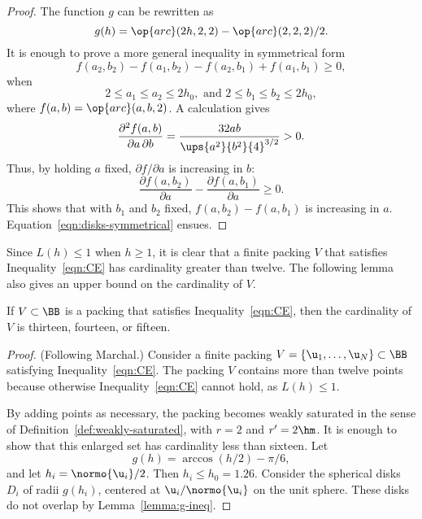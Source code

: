 \begin{cnl}
\begin{proof}
The function $g$ can be rewritten as
\[
g(h) = \op{arc}(2h,2,2) - \op{arc}(2,2,2)/2.
\]
It is enough to prove a  more general inequality in
  symmetrical form
\begin{equation}\label{eqn:disks-symmetrical}
f(a_2,b_2) - f(a_1,b_2) - f(a_2,b_1) + f(a_1,b_1)\ge0, 
\end{equation}
when
\[
2\le a_1 \le a_2 \le 2h_0,\text{ and } 2\le b_1\le b_2 \le 2h_0,
\]
where $f(a,b) = \op{arc}(a,b,2)$.  
A calculation gives
\[
 \frac {\partial^2 f(a,b)}{\partial a\,\partial b} = \frac{32 a b}{\ups{a^2}{b^2}{4}^{3/2}} > 0.
\]
Thus, by holding $a$ fixed, $\partial f/\partial a$ is increasing in $b$:
\[
 \frac {\partial f(a,b_2) } {\partial a} -\frac{\partial f(a,b_1)}{\partial a} \ge 0.
\]
This shows that with $b_1$ and $b_2$ fixed, 
$f(a,b_2)-f(a,b_1)$ is increasing in $a$.
Equation~\ref{eqn:disks-symmetrical} ensues.
\end{proof}

Since $L(h)\le 1$ when $h\ge1$, it is clear that a finite packing $V$
that satisfies Inequality~\ref{eqn:CE} has cardinality greater than twelve.
The following lemma also gives an upper bound on the cardinality of $V$.


\begin{lemma}[]
\label{lemma:13-14}  %
%
If $V\subset \BB$ is a packing that satisfies Inequality~\ref{eqn:CE},
then the cardinality of $V$ is thirteen, fourteen, or fifteen.
\end{lemma}


\begin{proof} (Following Marchal.) Consider a finite packing $
  V=\setenumdots{\u}{1}{N}\subset \BB$ satisfying
  Inequality~\ref{eqn:CE}.  The packing $V$ contains more than twelve
  points because otherwise Inequality~\ref{eqn:CE} cannot hold, as
  $L(h)\le 1$.

  By adding points as necessary, the packing becomes weakly saturated
  in the sense of Definition~\ref{def:weakly-saturated}, with $r=2$
  and $r'=2\hm$.  It is enough to show that this enlarged set has
  cardinality less than sixteen.  Let
\[ %
g(h) = \arccos(h/2) - \pi/6,  %
\] %
and let $h_i =
\normo{ \u_i}/2$.  Then $h_i\le h_0=1.26$.
Consider the spherical disks $D_i$ of radii $g(h_i)$,
centered at $ \u_i/\normo{ \u_i}$ on the unit sphere.  
These disks do not overlap by Lemma~\ref{lemma:g-ineq}.



\end{proof}
\end{cnl}
